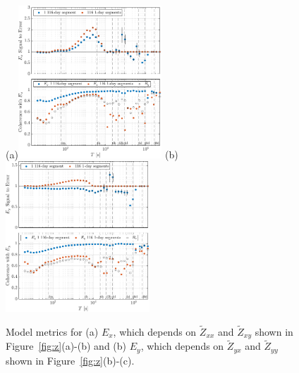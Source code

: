 \documentclass[draft,linenumbers]{agujournal2018}
\begin{document}
\begin{figure}[h!]
  \caption{Magnitudes and phases for components of $\boldsymbol{\mathcal{\widetilde{Z}}}$: (a) $|\widetilde{Z}_{xx}|$ and $\phi_{xx}$; (b) $|\widetilde{Z}_{xy}|$ and $\phi_{xy}$; (c) $|\widetilde{Z}_{yx}|$ and $\phi_{yx}$; and (d) $|\widetilde{Z}_{yy}|$ and $\phi_{yy}$. Open circles on the lower part of the impedance amplitude error bars indicate that this formula yielded a value below zero. The gray background in plots shown in Figure~\ref{fig:z} corresponds to periods for which the signal-to-prediction error, shown in Figure~\ref{fig:se}, is greater than unity.}
    \label{fig:z}

  \subfigure(a){\includegraphics[width=0.48\textwidth]{figures/snplot-Middelpos-tf1-E_x.pdf}} 
  \subfigure(b){\includegraphics[width=0.48\textwidth]{figures/snplot-Middelpos-tf1-E_y.pdf}} 

  \caption{Model metrics for (a) $E_x$, which depends on $\widetilde{Z}_{xx}$ and $\widetilde{Z}_{xy}$ shown in Figure~\ref{fig:z}(a)-(b) and (b) $E_y$, which depends on $\widetilde{Z}_{yx}$ and $\widetilde{Z}_{yy}$ shown in  Figure~\ref{fig:z}(b)-(c).}
  \label{fig:se}

\end{figure}

\end{document}
